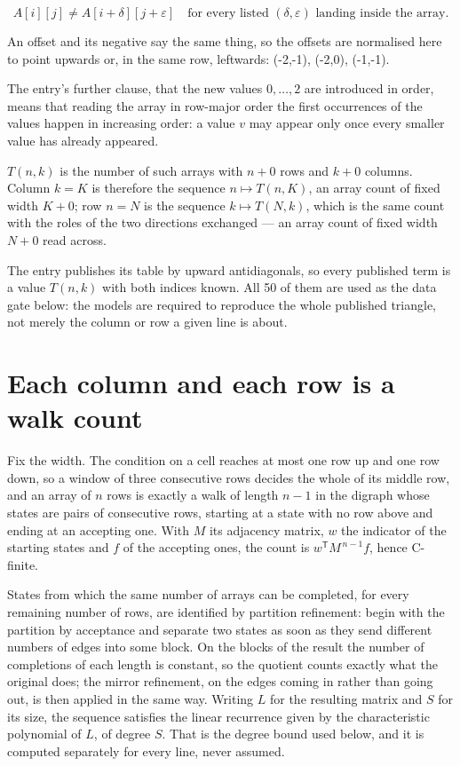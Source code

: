 \documentclass[11pt]{article}
\theoremstyle{definition}
\begin{document}
\[A[i][j] \ne A[i{+}\delta][j{+}\varepsilon]\quad\text{for every listed }(\delta,\varepsilon)\text{ landing inside the array.}\]

An offset and its negative say the same thing, so the offsets are normalised here to point upwards or, in the same row, leftwards: (-2,-1), (-2,0), (-1,-1).

The entry's further clause, that the new values $0,\dots,2$ are introduced in order, means that reading the array in row-major order the first occurrences of the values happen in increasing order: a value $v$ may appear only once every smaller value has already appeared.

$T(n,k)$ is the number of such arrays with $n + 0$ rows and $k + 0$ columns. Column $k = K$ is therefore the sequence $n \mapsto T(n,K)$, an array count of fixed width $K + 0$; row $n = N$ is the sequence $k \mapsto T(N,k)$, which is the same count with the roles of the two directions exchanged --- an array count of fixed width $N + 0$ read across.

The entry publishes its table by upward antidiagonals, so every published term is a value $T(n,k)$ with both indices known. All 50 of them are used as the data gate below: the models are required to reproduce the whole published triangle, not merely the column or row a given line is about.

\section{Each column and each row is a walk count}

Fix the width. The condition on a cell reaches at most one row up and one row down, so a window of three consecutive rows decides the whole of its middle row, and an array of $n$ rows is exactly a walk of length $n-1$ in the digraph whose states are pairs of consecutive rows, starting at a state with no row above and ending at an accepting one. With $M$ its adjacency matrix, $w$ the indicator of the starting states and $f$ of the accepting ones, the count is $w^{\mathsf T}M^{\,n-1}f$, hence C-finite.

States from which the same number of arrays can be completed, for every remaining number of rows, are identified by partition refinement: begin with the partition by acceptance and separate two states as soon as they send different numbers of edges into some block. On the blocks of the result the number of completions of each length is constant, so the quotient counts exactly what the original does; the mirror refinement, on the edges coming in rather than going out, is then applied in the same way. Writing $L$ for the resulting matrix and $S$ for its size, the sequence satisfies the linear recurrence given by the characteristic polynomial of $L$, of degree $S$. That is the degree bound used below, and it is computed separately for every line, never assumed.
\end{document}
